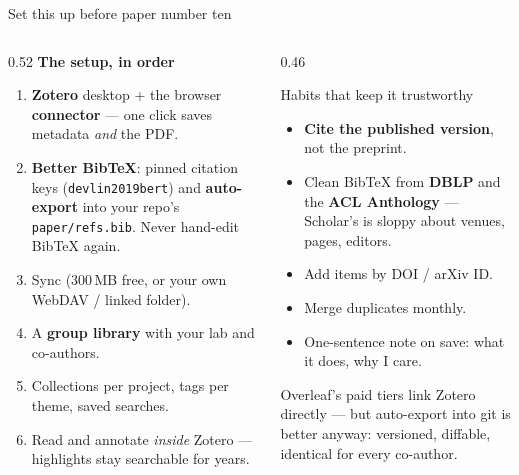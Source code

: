 \documentclass[aspectratio=169,11pt]{beamer}
\newcommand{\code}[1]{\texttt{\small #1}}
\newcommand{\key}[1]{\textbf{\color{brand}#1}}
\begin{document}
\begin{frame}{Set this up before paper number ten}
\begin{columns}[T]
\begin{column}{0.52\textwidth}
\textbf{The setup, in order}
\begin{enumerate}\footnotesize
  \item \key{Zotero} desktop + the browser \key{connector} --- one click saves
        metadata \emph{and} the PDF.
  \item \key{Better BibTeX}: pinned citation keys
        (\code{devlin2019bert}) and \key{auto-export} into your repo's
        \code{paper/refs.bib}. Never hand-edit BibTeX again.
  \item Sync (300\,MB free, or your own WebDAV / linked folder).
  \item A \key{group library} with your lab and co-authors.
  \item Collections per project, tags per theme, saved searches.
  \item Read and annotate \emph{inside} Zotero --- highlights stay searchable
        for years.
\end{enumerate}
\end{column}
\begin{column}{0.46\textwidth}
\begin{block}{Habits that keep it trustworthy}
\footnotesize
\begin{itemize}
  \item \key{Cite the published version}, not the preprint.
  \item Clean BibTeX from \key{DBLP} and the \key{ACL Anthology} --- Scholar's
        is sloppy about venues, pages, editors.
  \item Add items by DOI / arXiv ID.
  \item Merge duplicates monthly.
  \item One-sentence note on save: what it does, why I care.
\end{itemize}
\end{block}
\footnotesize
Overleaf's paid tiers link Zotero directly --- but auto-export into git is
better anyway: versioned, diffable, identical for every co-author.
\end{column}
\end{columns}
\end{frame}
\end{document}

